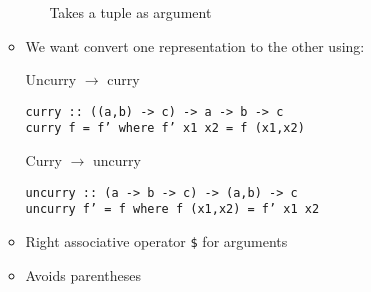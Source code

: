 \begin{itemize}
\begin{itemize}
\begin{itemize}
                     Takes a tuple as argument
                \end{itemize}
            \item We want convert one representation to the other using:
                \begin{itemize}
                     Uncurry $\to$ curry
\begin{verbatim}
curry :: ((a,b) -> c) -> a -> b -> c
curry f = f’ where f’ x1 x2 = f (x1,x2)
\end{verbatim}
                     Curry $\to$ uncurry
\begin{verbatim}
uncurry :: (a -> b -> c) -> (a,b) -> c
uncurry f’ = f where f (x1,x2) = f’ x1 x2
\end{verbatim}
                \end{itemize}
        \end{itemize}
        \begin{itemize}
            \item Right associative operator \verb+$+ for arguments
            \item Avoids parentheses
        \end{itemize}
\end{itemize}
